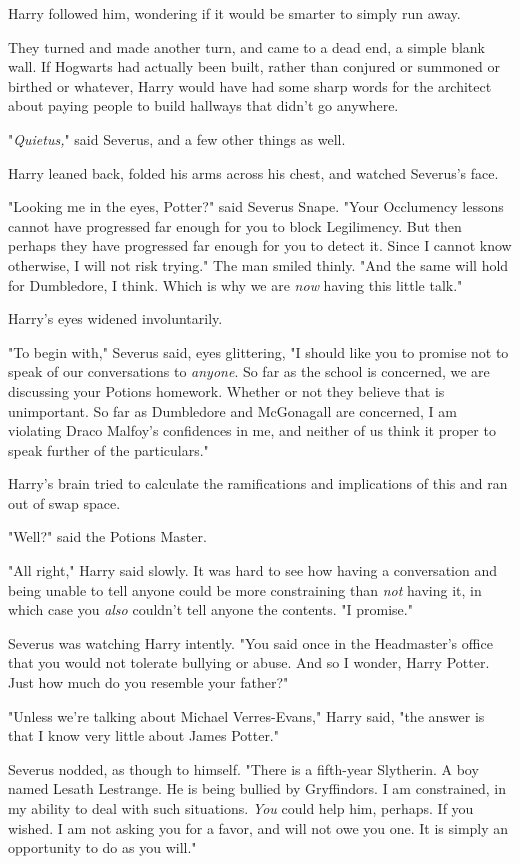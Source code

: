 Harry followed him, wondering if it would be smarter to simply run away.

They turned and made another turn, and came to a dead end, a simple blank wall.
If Hogwarts had actually been built, rather than conjured or summoned or
birthed or whatever, Harry would have had some sharp words for the architect
about paying people to build hallways that didn't go anywhere.

"\emph{Quietus,}" said Severus, and a few other things as well.

Harry leaned back, folded his arms across his chest, and watched Severus's face.

"Looking me in the eyes, Potter?" said Severus Snape. "Your Occlumency lessons
cannot have progressed far enough for you to block Legilimency. But then
perhaps they have progressed far enough for you to detect it. Since I cannot
know otherwise, I will not risk trying." The man smiled thinly. "And the same
will hold for Dumbledore, I think. Which is why we are \emph{now} having this
little talk."

Harry's eyes widened involuntarily.

"To begin with," Severus said, eyes glittering, "I should like you to promise
not to speak of our conversations to \emph{anyone}. So far as the school is
concerned, we are discussing your Potions homework. Whether or not they believe
that is unimportant. So far as Dumbledore and McGonagall are concerned, I am
violating Draco Malfoy's confidences in me, and neither of us think it proper
to speak further of the particulars."

Harry's brain tried to calculate the ramifications and implications of this and
ran out of swap space.

"Well?" said the Potions Master.

"All right," Harry said slowly. It was hard to see how having a conversation
and being unable to tell anyone could be more constraining than \emph{not}
having it, in which case you \emph{also} couldn't tell anyone the contents. "I
promise."

Severus was watching Harry intently. "You said once in the Headmaster's office
that you would not tolerate bullying or abuse. And so I wonder, Harry Potter.
Just how much do you resemble your father?"

"Unless we're talking about Michael Verres-Evans," Harry said, "the answer is
that I know very little about James Potter."

Severus nodded, as though to himself. "There is a fifth-year Slytherin. A boy
named Lesath Lestrange. He is being bullied by Gryffindors. I am{\el}
constrained, in my ability to deal with such situations. \emph{You} could help
him, perhaps. If you wished. I am not asking you for a favor, and will not owe
you one. It is simply an opportunity to do as you will."

